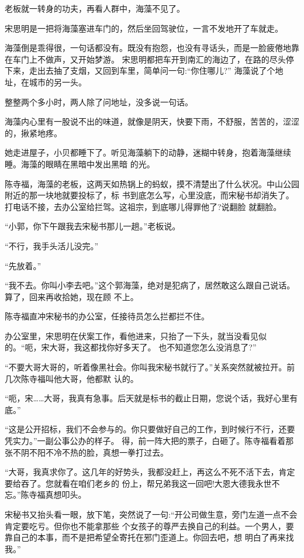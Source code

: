 \documentclass[11pt,a4paper,onecolumn]{article}
\begin{document}
老板就一转身的功夫，再看人群中，海藻不见了。

宋思明是一把将海藻塞进车门的，然后坐回驾驶位，一言不发地开了车就走。

海藻倒是乖得很，一句话都没有。既没有抱怨，也没有寻话头，而是一脸疲倦地靠在车门上不做声，又开始梦游。
宋思明都把车开到南汇的海边了，在路的尽头停下来，走出去抽了支烟，又回到车里，简单问一句:``你住哪儿?''
海藻说了个地址，在城市的另一头。

整整两个多小时，两人除了问地址，没多说一句话。

海藻内心里有一股说不出的味道，就像是阴天，快要下雨，不舒服，苦苦的，涩涩的，揪紧地疼。

她走进屋子，小贝都睡下了。听见海藻躺下的动静，迷糊中转身，抱着海藻继续睡。海藻的眼睛在黑暗中发出黑暗
的光。

陈寺福，海藻的老板，这两天如热锅上的蚂蚁，摸不清楚出了什么状况。中山公园附近的那一块地就要投标了，标
书到底怎么写，心里没底，而宋秘书却消失了。打电话不接，去办公室给拦驾。这祖宗，到底哪儿得罪他了?说翻脸
就翻脸。

``小郭，你下午跟我去宋秘书那儿一趟。''老板说。

``不行，我手头活儿没完。''

``先放着。''

``我不去。你叫小李去吧。''这个郭海藻，绝对是犯病了，居然敢这么跟自己说话。算了，回来再收拾她，现在顾
不上。

陈寺福直冲宋秘书的办公室，任接待员怎么拦都拦不住。

办公室里，宋思明在伏案工作，看他进来，只抬了一下头，就当没看见似的。``呃，宋大哥，我这都找你好多天了。
也不知道您怎么没消息了?''

``不要大哥大哥的，听着像黑社会。你叫我宋秘书就行了。''关系突然就被拉开。前几次陈寺福叫他大哥，他都默
认的。

``呃，宋……大哥，我真有急事。后天就是标书的截止日期，您说个话，我好心里有底。''

``这是公开招标，我们不会参与的。你只要做好自己的工作，到时候行不行，还要凭实力。''一副公事公办的样子。
得，前一阵大把的票子，白砸了。陈寺福看着那张不阴不阳不冷不热的脸，真想一拳打过去。

``大哥，我真求你了。这几年的好势头，我都没赶上，再这么不死不活下去，肯定要给吞了。您就看在咱们老乡的
份上，帮兄弟我这一回吧!大恩大德我永世不忘。''陈寺福真想叩头。

宋秘书又抬头看一眼，放下笔，突然说了一句:``开公司做生意，旁门左道一点不会肯定要吃亏。但你也不能拿那些
个女孩子的尊严去换自己的利益。一个男人，要靠自己的本事，而不是把希望全寄托在邪门歪道上。你回去吧，想
明白了再来找我。''
\end{document}
